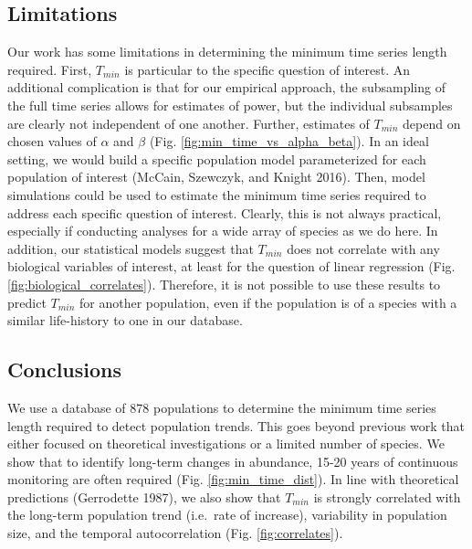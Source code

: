 \documentclass[12pt,]{article}
\begin{document}
\subsection{Limitations}\label{limitations}

Our work has some limitations in determining the minimum time series
length required. First, \(T_{min}\) is particular to the specific
question of interest. An additional complication is that for our
empirical approach, the subsampling of the full time series allows for
estimates of power, but the individual subsamples are clearly not
independent of one another. Further, estimates of \(T_{min}\) depend on
chosen values of \(\alpha\) and \(\beta\) (Fig.
\ref{fig:min_time_vs_alpha_beta}). In an ideal setting, we would build a
specific population model parameterized for each population of interest
(McCain, Szewczyk, and Knight 2016). Then, model simulations could be
used to estimate the minimum time series required to address each
specific question of interest. Clearly, this is not always practical,
especially if conducting analyses for a wide array of species as we do
here. In addition, our statistical models suggest that \(T_{min}\) does
not correlate with any biological variables of interest, at least for
the question of linear regression (Fig.
\ref{fig:biological_correlates}). Therefore, it is not possible to use
these results to predict \(T_{min}\) for another population, even if the
population is of a species with a similar life-history to one in our
database.

\subsection{Conclusions}\label{conclusions}

We use a database of 878 populations to determine the minimum time
series length required to detect population trends. This goes beyond
previous work that either focused on theoretical investigations or a
limited number of species. We show that to identify long-term changes in
abundance, 15-20 years of continuous monitoring are often required (Fig.
\ref{fig:min_time_dist}). In line with theoretical predictions
(Gerrodette 1987), we also show that \(T_{min}\) is strongly correlated
with the long-term population trend (i.e.~rate of increase), variability
in population size, and the temporal autocorrelation (Fig.
\ref{fig:correlates}).
\end{document}
